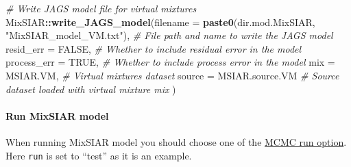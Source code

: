\documentclass[
]{article}
\newenvironment{Shaded}{\begin{snugshade}}{\end{snugshade}}
\newcommand{\AttributeTok}[1]{\textcolor[rgb]{0.13,0.29,0.53}{#1}}
\newcommand{\CommentTok}[1]{\textcolor[rgb]{0.56,0.35,0.01}{\textit{#1}}}
\newcommand{\ConstantTok}[1]{\textcolor[rgb]{0.56,0.35,0.01}{#1}}
\newcommand{\FunctionTok}[1]{\textcolor[rgb]{0.13,0.29,0.53}{\textbf{#1}}}
\newcommand{\NormalTok}[1]{#1}
\newcommand{\SpecialCharTok}[1]{\textcolor[rgb]{0.81,0.36,0.00}{\textbf{#1}}}
\newcommand{\StringTok}[1]{\textcolor[rgb]{0.31,0.60,0.02}{#1}}
\begin{document}
\begin{Shaded}
\begin{Highlighting}[]
\CommentTok{\# Write JAGS model file for virtual mixtures}
\NormalTok{MixSIAR}\SpecialCharTok{::}\FunctionTok{write\_JAGS\_model}\NormalTok{(}\AttributeTok{filename =} \FunctionTok{paste0}\NormalTok{(dir.mod.MixSIAR, }\StringTok{"MixSIAR\_model\_VM.txt"}\NormalTok{), }\CommentTok{\# File path and name to write the JAGS model}
                          \AttributeTok{resid\_err =} \ConstantTok{FALSE}\NormalTok{,                                          }\CommentTok{\# Whether to include residual error in the model}
                          \AttributeTok{process\_err =} \ConstantTok{TRUE}\NormalTok{,                                         }\CommentTok{\# Whether to include process error in the model}
                          \AttributeTok{mix =}\NormalTok{ MSIAR.VM,                                             }\CommentTok{\# Virtual mixtures dataset}
                          \AttributeTok{source =}\NormalTok{ MSIAR.source.VM                                    }\CommentTok{\# Source dataset loaded with virtual mixture mix}
\NormalTok{                          )}
\end{Highlighting}
\end{Shaded}

\hypertarget{run-mixsiar-model}{%
\paragraph{Run MixSIAR model}\label{run-mixsiar-model}}

When running MixSIAR model you should choose one of the
\href{http://brianstock.github.io/MixSIAR/articles/wolves_ex.html\#run-model}{MCMC
run option}. Here \texttt{run} is set to ``test'' as it is an example.
\end{document}
